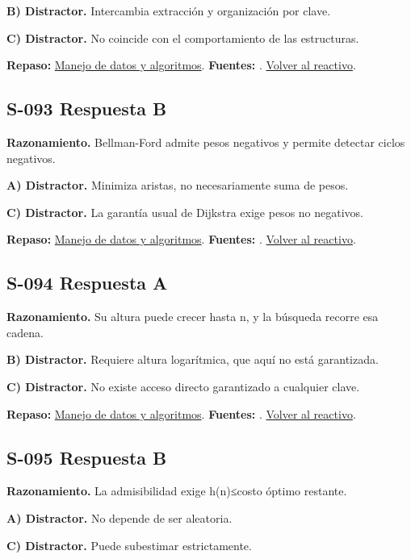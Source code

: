 \textbf{B) Distractor. }Intercambia extracción y organización por clave.

\textbf{C) Distractor. }No coincide con el comportamiento de las estructuras.

\textbf{Repaso:} \hyperref[sec:s3]{Manejo de datos y algoritmos}. \textbf{Fuentes:} \cite{algorithms,postgres,ai}. \hyperref[q:S-092]{Volver al reactivo}.\par\medskip

\subsection*{S-093 \quad Respuesta B}\label{s:S-093}
\textbf{Razonamiento.} Bellman-Ford admite pesos negativos y permite detectar ciclos negativos.

\textbf{A) Distractor. }Minimiza aristas, no necesariamente suma de pesos.

\textbf{C) Distractor. }La garantía usual de Dijkstra exige pesos no negativos.

\textbf{Repaso:} \hyperref[sec:s3]{Manejo de datos y algoritmos}. \textbf{Fuentes:} \cite{algorithms,postgres,ai}. \hyperref[q:S-093]{Volver al reactivo}.\par\medskip

\subsection*{S-094 \quad Respuesta A}\label{s:S-094}
\textbf{Razonamiento.} Su altura puede crecer hasta n, y la búsqueda recorre esa cadena.

\textbf{B) Distractor. }Requiere altura logarítmica, que aquí no está garantizada.

\textbf{C) Distractor. }No existe acceso directo garantizado a cualquier clave.

\textbf{Repaso:} \hyperref[sec:s3]{Manejo de datos y algoritmos}. \textbf{Fuentes:} \cite{algorithms,postgres,ai}. \hyperref[q:S-094]{Volver al reactivo}.\par\medskip

\subsection*{S-095 \quad Respuesta B}\label{s:S-095}
\textbf{Razonamiento.} La admisibilidad exige h(n)≤costo óptimo restante.

\textbf{A) Distractor. }No depende de ser aleatoria.

\textbf{C) Distractor. }Puede subestimar estrictamente.

